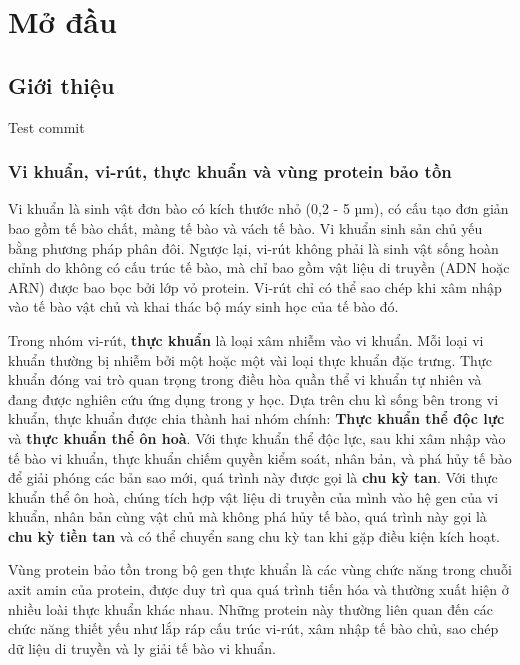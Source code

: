\chapter{Mở đầu}
\setcounter{page}{1}
\section{Giới thiệu}

Test commit

\subsection{Vi khuẩn, vi-rút, thực khuẩn và vùng protein bảo tồn}

Vi khuẩn là sinh vật đơn bào có kích thước nhỏ (0,2 - 5 µm), có cấu tạo đơn giản bao gồm tế bào chất, màng tế bào và vách tế bào. Vi khuẩn sinh sản chủ yếu bằng phương pháp phân đôi. Ngược lại, vi-rút không phải là sinh vật sống hoàn chỉnh do không có cấu trúc tế bào, mà chỉ bao gồm vật liệu di truyền (ADN hoặc ARN) được bao bọc bởi lớp vỏ protein. Vi-rút chỉ có thể sao chép khi xâm nhập vào tế bào vật chủ và khai thác bộ máy sinh học của tế bào đó.

Trong nhóm vi-rút, \textbf{thực khuẩn} là loại xâm nhiễm vào vi khuẩn. Mỗi loại vi khuẩn thường bị nhiễm bởi một hoặc một vài loại thực khuẩn đặc trưng. Thực khuẩn đóng vai trò quan trọng trong điều hòa quần thể vi khuẩn tự nhiên và đang được nghiên cứu ứng dụng trong y học. Dựa trên chu kì sống bên trong vi khuẩn, thực khuẩn được chia thành hai nhóm chính: \textbf{Thực khuẩn thể độc lực} và \textbf{thực khuẩn thể ôn hoà}. Với thực khuẩn thể độc lực, sau khi xâm nhập vào tế bào vi khuẩn, thực khuẩn chiếm quyền kiểm soát, nhân bản, và phá hủy tế bào để giải phóng các bản sao mới, quá trình này được gọi là \textbf{chu kỳ tan}. Với thực khuẩn thể ôn hoà, chúng tích hợp vật liệu di truyền của mình vào hệ gen của vi khuẩn, nhân bản cùng vật chủ mà không phá hủy tế bào, quá trình này gọi là \textbf{chu kỳ tiền tan} và có thể chuyển sang chu kỳ tan khi gặp điều kiện kích hoạt.

Vùng protein bảo tồn trong bộ gen thực khuẩn là các vùng chức năng trong chuỗi axit amin của protein, được duy trì qua quá trình tiến hóa và thường xuất hiện ở nhiều loài thực khuẩn khác nhau. Những protein này thường liên quan đến các chức năng thiết yếu như lắp ráp cấu trúc vi-rút, xâm nhập tế bào chủ, sao chép dữ liệu di truyền và ly giải tế bào vi khuẩn.


